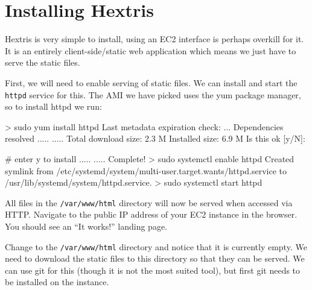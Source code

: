 \documentclass{csse4400}
\begin{document}
%
%
%

\section{Installing Hextris}\label{sec:installHextris}
Hextris \cite{hextris} is very simple to install, using an EC2 interface is perhaps overkill for it.
It is an entirely client-side/static web application which means we just have to serve the static files.

First, we will need to enable serving of static files.
We can install and start the \texttt{httpd} service for this.
The AMI we have picked uses the yum package manager, so to install httpd we run:

\begin{code}[language=bash,numbers=none]{}
> sudo yum install httpd
Last metadata expiration check: ...
Dependencies resolved
..... 
..... 
Total download size: 2.3 M
Installed size: 6.9 M
Is this ok [y/N]:

# enter y to install
..... 
..... 
Complete!
> sudo systemctl enable httpd
Created symlink from /etc/systemd/system/multi-user.target.wants/httpd.service to /usr/lib/systemd/system/httpd.service.
> sudo systemctl start httpd
\end{code}

All files in the \texttt{/var/www/html} directory will now be served when accessed via HTTP.
Navigate to the public IP address of your EC2 instance in the browser.
You should see an ``It works!'' landing page.

Change to the \texttt{/var/www/html} directory and notice that it is currently empty.
We need to download the static files to this directory so that they can be served.
We can use git for this (though it is not the most suited tool),
but first git needs to be installed on the instance.
\end{document}
